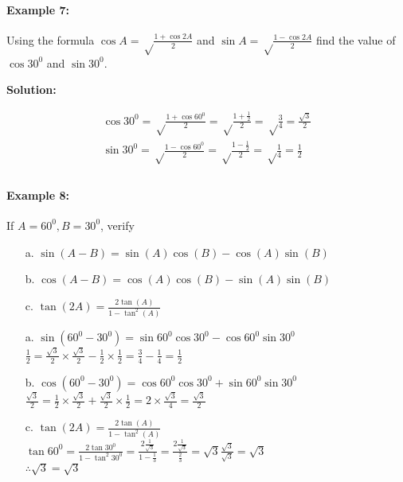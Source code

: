 \documentclass{article}
\begin{document}
\paragraph{Example 7:}
Using the formula $\cos A = \sqrt\frac{1+\cos2A}{2}$ and $\sin A = \sqrt\frac{1-\cos2A}{2}$
find the value of $\cos30^{0}$ and $\sin30^{0}$.

{\scriptsize \textbf{Solution:}}

\[
  \begin{aligned}
    \cos30^{0} = \sqrt\frac{1+\cos60^{0}}{2} =  \sqrt\frac{1+\frac{1}{2}}{2} = \sqrt\frac{3}{4} = \frac{\sqrt{3}}{2} \\
    \sin30^{0} = \sqrt\frac{1-\cos60^{0}}{2} =  \sqrt\frac{1-\frac{1}{2}}{2} = \sqrt\frac{1}{4} = \frac{1}{2} \\
  \end{aligned}
\]

\paragraph{Example 8:}
If $A = 60^{0}, B = 30^{0}$, verify

\begin{enumerate}
  \item[a.] $\sin(A-B) = \sin(A) \cos(B) - \cos(A) \sin(B)$
  \item[b.] $\cos(A-B) = \cos(A) \cos(B) - \sin(A) \sin(B)$
  \item[c.] $\tan(2A) = \frac{2\tan(A)}{1-\tan^{2}(A)}$
  \item[a.] $\sin(60^{0}-30^{0}) = \sin60^{0}\cos30^{0} - \cos60^{0}\sin30^{0}$ \\
        $ \frac{1}{2} = \frac{\sqrt{3}}{2} \times \frac{\sqrt{3}}{2} - \frac{1}{2} \times \frac{1}{2} = \frac{3}{4} - \frac{1}{4} = \frac{1}{2} $
  \item[b.] $\cos(60^{0}-30^{0}) = \cos60^{0}\cos30^{0} + \sin60^{0}\sin30^{0}$ \\
        $ \frac{\sqrt{3}}{2} = \frac{1}{2} \times \frac{\sqrt{3}}{2} + \frac{\sqrt{3}}{2} \times \frac{1}{2} = 2 \times \frac{\sqrt{3}}{4} = \frac{\sqrt{3}}{2}$
  \item[c.] $\tan(2A) = \frac{2\tan(A)}{1-\tan^{2}(A)}$ \\
        $ \tan 60^{0} = \frac{2\tan30^{0}}{1-\tan^{2}30^{0}} = \frac{2\frac{1}{\sqrt{3}}}{1-\frac{1}{3}} = \frac{2\frac{1}{\sqrt{3}}}{\frac{2}{3}} = \sqrt{3} \frac{\sqrt{3}}{\sqrt{3}} = \sqrt{3}$ \\
        $\therefore \sqrt{3} = \sqrt{3}$
\end{enumerate}
\end{document}
